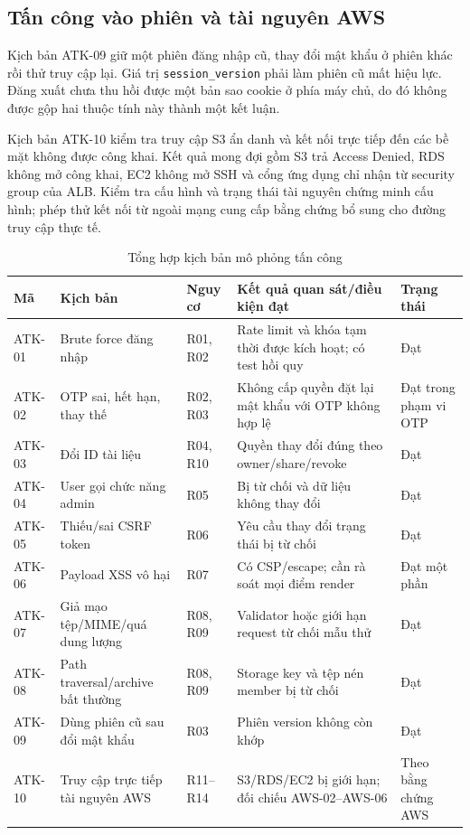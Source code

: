 \subsection{Tấn công vào phiên và tài nguyên AWS}
Kịch bản ATK-09 giữ một phiên đăng nhập cũ, thay đổi mật khẩu ở phiên khác rồi thử truy cập lại. Giá trị \texttt{session\_version} phải làm phiên cũ mất hiệu lực. Đăng xuất chưa thu hồi được một bản sao cookie ở phía máy chủ, do đó không được gộp hai thuộc tính này thành một kết luận.

Kịch bản ATK-10 kiểm tra truy cập S3 ẩn danh và kết nối trực tiếp đến các bề mặt không được công khai. Kết quả mong đợi gồm S3 trả Access Denied, RDS không mở công khai, EC2 không mở SSH và cổng ứng dụng chỉ nhận từ security group của ALB. Kiểm tra cấu hình và trạng thái tài nguyên chứng minh cấu hình; phép thử kết nối từ ngoài mạng cung cấp bằng chứng bổ sung cho đường truy cập thực tế.

\begin{table}[htbp]\centering\scriptsize
\caption{Tổng hợp kịch bản mô phỏng tấn công}
\label{tab:attack-simulation}
\begin{tabularx}{\textwidth}{P{1.25cm}P{3.1cm}P{2.0cm}X P{1.8cm}}\toprule
\textbf{Mã}&\textbf{Kịch bản}&\textbf{Nguy cơ}&\textbf{Kết quả quan sát/điều kiện đạt}&\textbf{Trạng thái}\\\midrule
ATK-01 & Brute force đăng nhập & R01, R02 & Rate limit và khóa tạm thời được kích hoạt; có test hồi quy & Đạt\\
ATK-02 & OTP sai, hết hạn, thay thế & R02, R03 & Không cấp quyền đặt lại mật khẩu với OTP không hợp lệ & Đạt trong phạm vi OTP\\
ATK-03 & Đổi ID tài liệu & R04, R10 & Quyền thay đổi đúng theo owner/share/revoke & Đạt\\
ATK-04 & User gọi chức năng admin & R05 & Bị từ chối và dữ liệu không thay đổi & Đạt\\
ATK-05 & Thiếu/sai CSRF token & R06 & Yêu cầu thay đổi trạng thái bị từ chối & Đạt\\
ATK-06 & Payload XSS vô hại & R07 & Có CSP/escape; cần rà soát mọi điểm render & Đạt một phần\\
ATK-07 & Giả mạo tệp/MIME/quá dung lượng & R08, R09 & Validator hoặc giới hạn request từ chối mẫu thử & Đạt\\
ATK-08 & Path traversal/archive bất thường & R08, R09 & Storage key và tệp nén member bị từ chối & Đạt\\
ATK-09 & Dùng phiên cũ sau đổi mật khẩu & R03 & Phiên version không còn khớp & Đạt\\
ATK-10 & Truy cập trực tiếp tài nguyên AWS & R11--R14 & S3/RDS/EC2 bị giới hạn; đối chiếu AWS-02--AWS-06 & Theo bằng chứng AWS\\\bottomrule
\end{tabularx}\end{table}

